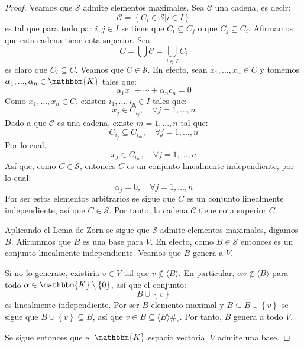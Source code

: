 \documentclass[12pt]{article}
\newcounter{it}
\theoremstyle{largebreak}
\newcommand{\bbm}[1]{\mathbbm{#1}}
\newcommand\contradiction{\ensuremath{\#_c}}
\begin{document}
\begin{proof}
        Veamos que $\mathcal{S}$ admite elementos maximales. Sea $\mathcal{C}$ una cadena, es decir:
        \begin{equation*}
            \mathcal{C}=\left\{C_i\in\mathcal{S}\Big|i\in I \right\}
        \end{equation*}
        es tal que para todo par $i,j\in I$ se tiene que $C_i\subseteq C_j$ o que $C_j\subseteq C_i$. Afirmamos que esta cadena tiene cota superior. Sea:
        \begin{equation*}
            C=\bigcup\mathcal{C}=\bigcup_{ i\in I}C_i
        \end{equation*}
        es claro que $C_i\subseteq C$. Veamos que $C\in\mathcal{S}$. En efecto, sean $x_1,...,x_n\in C$ y tomemos $\alpha_1,...,\alpha_n\in\bbm{K}$ tales que:
        \begin{equation*}
            \alpha_1x_1+\cdots+\alpha_nc_n=0
        \end{equation*}
        Como $x_1,...,x_n\in C$, existen $i_1,...,i_n\in I$ tales que:
        \begin{equation*}
            x_j\in C_{ i_j},\quad\forall j=1,...,n
        \end{equation*}
        Dado a que $\mathcal{C}$ es una cadena, existe $m=1,...,n$ tal que:
        \begin{equation*}
            C_{i_j}\subseteq C_{ i_m},\quad\forall j=1,...,n
        \end{equation*}
        Por lo cual,
        \begin{equation*}
            x_j\in C_{ i_m},\quad\forall j=1,...,n
        \end{equation*}
        Así que, como $C\in\mathcal{S}$, entonces $C$ es un conjunto linealmente independiente, por lo cual:
        \begin{equation*}
            \alpha_j=0,\quad\forall j=1,...,n
        \end{equation*}
        Por ser estos elementos arbitrarios se sigue que $C$ es un conjunto linealmente independiente, así que $C\in\mathcal{S}$. Por tanto, la cadena $\mathcal{C}$ tiene cota superior $C$.

        Aplicando el Lema de Zorn se sigue que $\mathcal{S}$ admite elementos maximales, digamos $B$. Afirammos que $B$ es una base para $V$. En efecto, como $B\in\mathcal{S}$ entonces es un conjunto linealmente independiente. Veamos que $B$ genera a $V$. 
        
        Si no lo generase, existiría $v\in V$ tal que $v\notin\langle B\rangle$. En particular, $\alpha v\notin\langle B\rangle$ para todo $\alpha\in\bbm{K}\setminus\left\{0\right\}$, así que el conjunto:
        \begin{equation*}
            B\cup\left\{v\right\}
        \end{equation*}
        es linealmente independiente. Por ser $B$ elemento maximal y $B\subseteq B\cup\left\{v\right\}$ se sigue que $B\cup\left\{v\right\}\subseteq B$, así que $v\in B\subseteq\langle B\rangle$\contradiction. Por tanto, $B$ genera a todo $V$.

        Se sigue entonces que el $\bbm{K}$.espacio vectorial $V$ admite una base.
    \end{proof}
\end{document}
